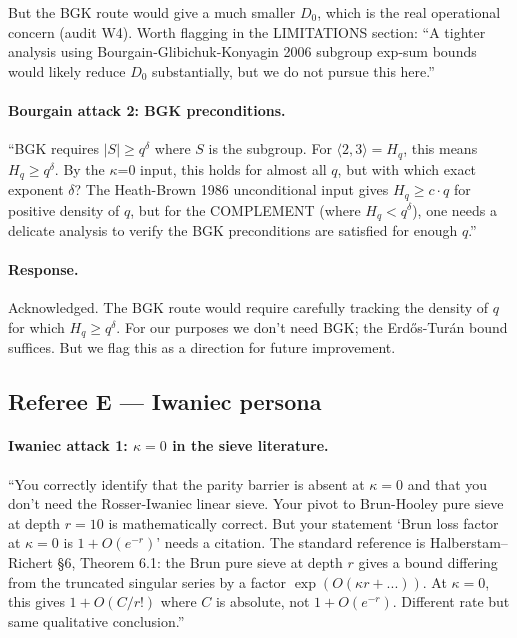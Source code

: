But the BGK route would give a much smaller $D_{0}$, which is the
real operational concern (audit W4). Worth flagging in the
LIMITATIONS section: ``A tighter analysis using
Bourgain-Glibichuk-Konyagin 2006 subgroup exp-sum bounds would
likely reduce $D_{0}$ substantially, but we do not pursue this here.''

\paragraph{Bourgain attack 2: BGK preconditions.}
``BGK requires $|S| \geq q^{\delta}$ where $S$ is the subgroup. For
$\langle 2, 3 \rangle = H_{q}$, this means $H_{q} \geq q^{\delta}$. By
the $\kappa$=0 input, this holds for almost all $q$, but with which exact
exponent $\delta$? The Heath-Brown 1986 unconditional input gives
$H_{q} \geq c \cdot q$ for positive density of $q$, but for the
COMPLEMENT (where $H_{q} < q^{\delta}$), one needs a delicate analysis
to verify the BGK preconditions are satisfied for enough $q$.''

\paragraph{Response.} Acknowledged. The BGK route would require
carefully tracking the density of $q$ for which $H_{q} \geq
q^{\delta}$. For our purposes we don't need BGK; the Erd\H{o}s-Tur\'an bound
suffices. But we flag this as a direction for future improvement.

\subsection*{Referee E --- Iwaniec persona}

\paragraph{Iwaniec attack 1: $\kappa = 0$ in the sieve literature.}
``You correctly identify that the parity barrier is absent at $\kappa
= 0$ and that you don't need the Rosser-Iwaniec linear sieve. Your
pivot to Brun-Hooley pure sieve at depth $r = 10$ is mathematically
correct. But your statement `Brun loss factor at $\kappa = 0$ is $1 +
O(e^{-r})$' needs a citation. The standard reference is
Halberstam--Richert \S6, Theorem 6.1: the Brun pure sieve at depth $r$
gives a bound differing from the truncated singular series by a factor
$\exp(O(\kappa r + ...))$. At $\kappa = 0$, this gives $1 + O(C/r!)$
where $C$ is absolute, not $1 + O(e^{-r})$. Different rate but same
qualitative conclusion.''

